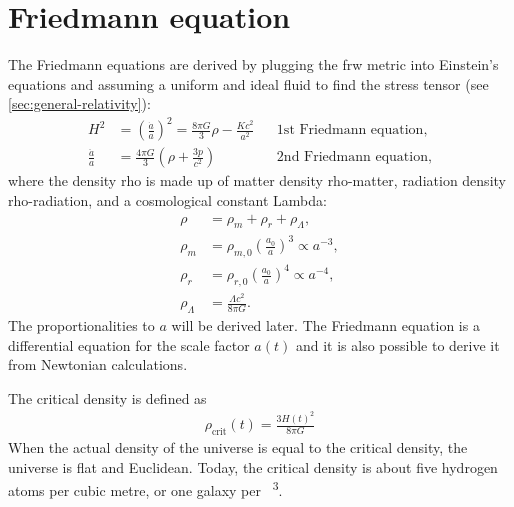 \section{Friedmann equation}
\label{sec:Friedmann}

The Friedmann equations are derived by plugging the \ac{frw} metric into Einstein's equations and assuming a uniform and ideal fluid to find the stress tensor (see \cref{sec:general-relativity}):
\begin{align*}
	H^2 &= \left( \frac{\dot{a}}{a} \right)^2 = \frac{8 \pi G}{3} \rho - \frac{K c^2}{a^2} && \text{1st Friedmann equation,}\\
	\frac{\ddot{a}}{a} &= \frac{4 \pi G}{3} \left( \rho + \frac{3 p}{c^2} \right) && \text{2nd Friedmann equation,}
\end{align*}
where the density \gls{rho} is made up of matter density \gls{rho-matter}, radiation density \gls{rho-radiation}, and a cosmological constant \gls{Lambda}:
\begin{align*}
	\rho &= \rho_m + \rho_r + \rho_{\Lambda},\\
	\rho_m &= \rho_{m,0} \left( \frac{a_0}{a} \right)^3 \propto a^{-3},\\
	\rho_r &= \rho_{r,0} \left( \frac{a_0}{a} \right)^4 \propto a^{-4},\\
	\rho_{\Lambda} &= \frac{\Lambda c^2}{8 \pi G}.
\end{align*}
The proportionalities to $a$ will be derived later.
The Friedmann equation is a differential equation for the scale factor $a(t)$ and it is also possible to derive it from Newtonian calculations.

The critical density is defined as
\begin{align*}
	\rho_\text{crit}(t) = \frac{3 H(t)^2}{8 \pi G}
\end{align*}
When the actual density of the universe is equal to the critical density, the universe is flat and Euclidean.
Today, the critical density is about five hydrogen atoms per cubic metre, or one galaxy per \si{\mega\parsec\cubed}.

